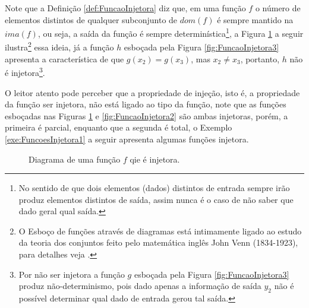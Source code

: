 Note que a Definição \ref{def:FuncaoInjetora} diz que, em uma função $f$ o número de elementos distintos de qualquer subconjunto de $dom(f)$ é sempre mantido na $ima(f)$, ou seja, a saída da função é sempre determinística\footnote{No sentido de que dois elementos (dados) distintos de entrada sempre irão produz elementos distintos de saída, assim nunca é o caso de não saber que dado geral qual saída.}, a Figura \ref{fig:FuncaoInjetora1} a seguir ilustra\footnote{O Esboço de funções através de diagramas está intimamente ligado ao estudo da teoria dos conjuntos feito pelo matemática inglês John Venn (1834-1923), para detalhes veja \cite{carmo2013}.} essa ideia, já a função $h$ esboçada pela Figura \ref{fig:FuncaoInjetora3} apresenta a característica de que $g(x_2) = g(x_3)$, mas $x_2 \neq x_3$, portanto, $h$ não é injetora\footnote{Por não ser injetora a função $g$ esboçada pela Figura \ref{fig:FuncaoInjetora3} produz não-determinismo, pois dado apenas a informação de saída $y_2$ não é possível determinar qual dado de entrada gerou tal saída.}.

O leitor atento pode perceber que a propriedade de injeção, isto é, a propriedade da função ser injetora, não está ligado ao tipo da função, note que as funções esboçadas nas Figuras \ref{fig:FuncaoInjetora1} e \ref{fig:FuncaoInjetora2} são ambas injetoras, porém, a primeira é parcial, enquanto que a segunda é total, o Exemplo \ref{exe:FuncoesInjetora1} a seguir apresenta algumas funções injetora.

\begin{figure}[h]
	\centering
	\caption{Diagrama de uma função $f$ qie é injetora.}
	\label{fig:FuncaoInjetora1}	
\end{figure}

